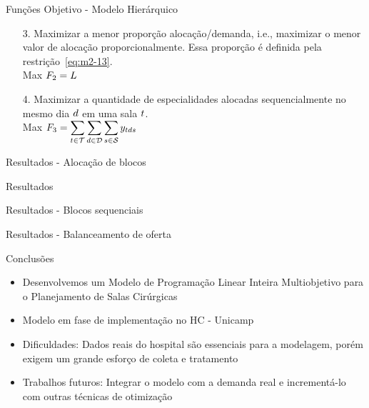 \documentclass[handout]{beamer}
\begin{document}
\begin{frame}{Funções Objetivo - Modelo Hierárquico}
    \begin{enumerate}
        \setlength\itemsep{2em}
        \item[3.] Maximizar a menor proporção alocação/demanda, i.e., maximizar o menor valor de alocação proporcionalmente. Essa proporção é definida pela restrição~\ref{eq:m2-13}.\\
        \vspace{0.5em}  
        Max $\displaystyle F_2 = L$

        \item[4.] Maximizar a quantidade de especialidades alocadas sequencialmente no mesmo dia $d$ em uma sala $t$.\\
        \vspace{0.5em}
        Max $\displaystyle F_3 = \sum_{t \in \mathcal{T}} \sum_{d \in \mathcal{D}} \sum_{s \in \mathcal{S}} y_{tds}$
    \end{enumerate}
\end{frame}


\begin{frame}{Resultados - Alocação de blocos}
\end{frame}


\begin{frame}{Resultados}
\end{frame}


\begin{frame}{Resultados - Blocos sequenciais}
\end{frame}

\begin{frame}{Resultados - Balanceamento de oferta}
\end{frame}

\begin{frame}{Conclusões}
    \begin{itemize}
        \setlength\itemsep{1em}
        \item<2-> Desenvolvemos um Modelo de Programação Linear Inteira Multiobjetivo para o Planejamento de Salas Cirúrgicas
        \item<3-> Modelo em fase de implementação no HC - Unicamp
        \item<5-> Dificuldades: Dados reais do hospital são essenciais para a modelagem, porém exigem um grande esforço de coleta e tratamento
        \item<6-> Trabalhos futuros: Integrar o modelo com a demanda real e incrementá-lo com outras técnicas de otimização
    \end{itemize}
\end{frame}
\end{document}
